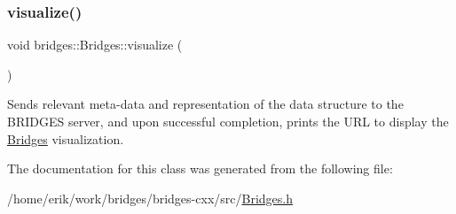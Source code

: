 \subsubsection{\texorpdfstring{visualize()}{visualize()}}
{\footnotesize\ttfamily void bridges\+::\+Bridges\+::visualize (\begin{DoxyParamCaption}{ }\end{DoxyParamCaption})\hspace{0.3cm}{\ttfamily [inline]}}

Sends relevant meta-\/data and representation of the data structure to the B\+R\+I\+D\+G\+ES server, and upon successful completion, prints the U\+RL to display the \hyperlink{classbridges_1_1_bridges}{Bridges} visualization. 

The documentation for this class was generated from the following file\+:\begin{DoxyCompactItemize}
\item 
/home/erik/work/bridges/bridges-\/cxx/src/\hyperlink{_bridges_8h}{Bridges.\+h}\end{DoxyCompactItemize}
